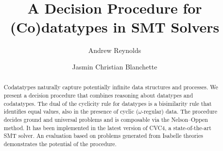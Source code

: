 \newcommand{\thO}{T_{o}}
\newcommand{\thD}{T_{d}}

\newcommand\Types{\mathcal{Y}}
\newcommand\Funcs{\mathcal{F}}

\newcommand\Data{\Types_{\mathrm{dt}}}
\newcommand\Codata{\Types_{\mathrm{codt}}}
\newcommand\Nondata{\Types_{\mathrm{ord}}}

\newcommand\Ctr{\Funcs_{\mathrm{ctr}}}
\newcommand\Sel{\Funcs_{\mathrm{sel}}}

\newcommand\vthinspace{\kern+0.083333em}
\newcommand\negvthinspace{\kern-0.083333em}

\usepackage[
   a4paper,
   pdftex,
   pdftitle={A Decision Procedure for (Co)datatypes in SMT Solvers},
   pdfauthor={Andrew Reynolds and Jasmin Christian Blanchette},
   pdfkeywords={},
   pdfborder={0 0 0},
   draft=false,
   bookmarksnumbered,
   bookmarks,
   bookmarksdepth=2,
   bookmarksopenlevel=2,
   bookmarksopen]{hyperref}


\global\def\figurename{Figure}


\makeatletter
\ps@myheadings
\makeatother







\title{A Decision Procedure for (Co)datatypes in SMT Solvers}

\author {Andrew Reynolds \and Jasmin Christian Blanchette}

\maketitle

\begin{abstract}
Codatatypes naturally capture potentially infinite data structures and
processes. We present a decision procedure that combines reasoning about
datatypes and codatatypes. The dual of the cyclicity rule for datatypes is a
bisimilarity rule that identifies equal values, also in the presence of cyclic
($\omega$-regular) data. The procedure decides ground and universal
problems and is composable via the Nelson--Oppen method. It has been
implemented in the latest version of CVC4, a state-of-the-art SMT solver. An
evaluation based on problems generated from Isabelle theories demonstrates the
potential of the procedure.
\end{abstract}

